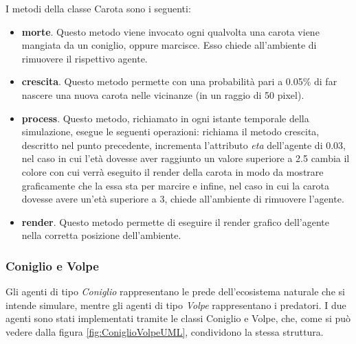 \documentclass[11pt]{article}
\begin{document}
I metodi della classe Carota sono i seguenti:
\begin{itemize}
    \item \textbf{morte}. Questo metodo viene invocato ogni qualvolta una carota viene mangiata da un coniglio, oppure marcisce. Esso chiede all'ambiente di rimuovere il rispettivo agente. 
    \item \textbf{crescita}. Questo metodo permette con una probabilità pari a 0.05\% di far nascere una nuova carota nelle vicinanze (in un raggio di 50 pixel).
    \item \textbf{process}. Questo metodo, richiamato in ogni istante temporale della simulazione, esegue le seguenti operazioni: richiama il metodo crescita, descritto nel punto precedente, incrementa l'attributo \emph{eta} dell'agente di 0.03, nel caso in cui l'età dovesse aver raggiunto un valore superiore a 2.5 cambia il colore con cui verrà eseguito il render della carota in modo da mostrare graficamente che la essa sta per marcire e infine, nel caso in cui la carota dovesse avere un'età superiore a 3, chiede all'ambiente di rimuovere l'agente. 
    \item \textbf{render}. Questo metodo permette di eseguire il render grafico dell'agente nella corretta posizione dell'ambiente. 
\end{itemize}
\subsubsection{Coniglio e Volpe}
Gli agenti di tipo \emph{Coniglio} rappresentano le prede dell'ecosistema naturale che si intende simulare, mentre gli agenti di tipo \emph{Volpe} rappresentano i predatori. I due agenti sono stati implementati tramite le classi Coniglio e Volpe, che, come si può vedere dalla figura \ref{fig:ConiglioVolpeUML}, condividono la stessa struttura. 
\end{document}
